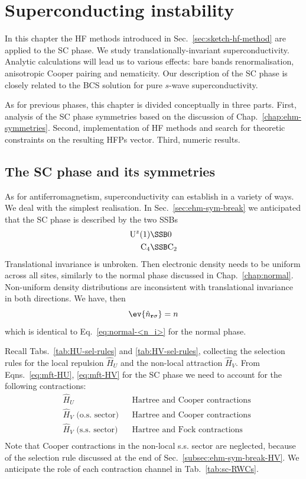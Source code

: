 \def\GraphicsFolder{chapters/superconducting-instability/pictures}
\chapter{Superconducting instability}\label{chap:sc}

In this chapter the HF methods introduced in Sec.~\ref{sec:sketch-hf-method} are applied to the SC phase. We study translationally-invariant superconductivity. Analytic calculations will lead us to various effects: bare bands renormalisation, anisotropic Cooper pairing and nematicity. Our description of the SC phase is closely related to the BCS solution for pure $s$-wave superconductivity.

As for previous phases, this chapter is divided conceptually in three parts. First, analysis of the SC phase symmetries based on the discussion of Chap.~\ref{chap:ehm-symmetries}. Second, implementation of HF methods and search for theoretic constraints on the resulting HFPs vector. Third, numeric results.

\section{The SC phase and its symmetries}\label{sec:sc-phase-theory}

As for antiferromagnetism, superconductivity can establish in a variety of ways. We deal with the simplest realisation. In Sec.~\ref{sec:ehm-sym-break} we anticipated that the SC phase is described by the two SSBs
\[
\begin{aligned}
	\mathrm{U}^z(1) &\SSB 0 \\
	\mathrm{C}_4 &\SSB \mathrm{C}_2
\end{aligned}
\]
Translational invariance is unbroken. Then electronic density needs to be uniform across all sites, similarly to the normal phase discussed in Chap.~\ref{chap:normal}. Non-uniform density distributions are inconsistent with translational invariance in both directions. We have, then
\begin{equation}\label{eq:sc-density-ansatz}
	\ev{\hat n_{\mathbf{r}\sigma}} = n
\end{equation}
which is identical to Eq.~\eqref{eq:normal-<n_i>} for the normal phase.

Recall Tabs.~\ref{tab:HU-sel-rules} and \ref{tab:HV-sel-rules}, collecting the selection rules for the local repulsion $\hat H_U$ and the non-local attraction $\hat H_V$. From Eqns.~\eqref{eq:mft-HU}, \eqref{eq:mft-HV} for the SC phase we need to account for the following contractions:
\[
\begin{aligned}
	&\hat H_U 
	&&\text{Hartree and Cooper contractions} \\
	&\hat H_V \text{ (o.s. sector)}
	&&\text{Hartree and Cooper contractions} \\
	&\hat H_V \text{ (s.s. sector)}
	&&\text{Hartree and Fock contractions} \\
\end{aligned}	
\]
Note that Cooper contractions in the non-local s.s. sector are neglected, because of the selection rule discussed at the end of Sec.~\ref{subsec:ehm-sym-break-HV}. We anticipate the role of each contraction channel in Tab.~\ref{tab:sc-RWCs}.

